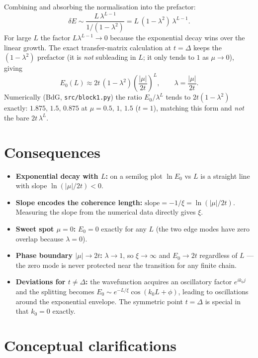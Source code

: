 \documentclass[11pt]{article}
\begin{document}
Combining and absorbing the normalisation into the prefactor:
\begin{equation}
  \delta E
  \sim \frac{L\,\lambda^{L-1}}{1/(1-\lambda^2)}
  = L\,(1-\lambda^2)\,\lambda^{L-1}.
\end{equation}
For large $L$ the factor $L\lambda^{L-1} \to 0$ because the exponential decay
wins over the linear growth.  The exact transfer-matrix calculation at
$t=\Delta$ keeps the $(1-\lambda^2)$ prefactor (it is \emph{not} subleading in
$L$; it only tends to $1$ as $\mu\to 0$), giving
\begin{equation}
  \boxed{E_0(L) \approx 2t\,(1-\lambda^2)\left(\frac{|\mu|}{2t}\right)^L,
  \qquad \lambda=\frac{|\mu|}{2t}.}
\end{equation}
Numerically (BdG, \texttt{src/block1.py}) the ratio $E_0/\lambda^L$ tends to
$2t(1-\lambda^2)$ exactly: $1.875,\,1.5,\,0.875$ at $\mu=0.5,\,1,\,1.5$
($t=1$), matching this form and \emph{not} the bare $2t\,\lambda^L$.

\section{Consequences}

\begin{itemize}
  \item \textbf{Exponential decay with $L$:} on a semilog plot $\ln E_0$ vs $L$
    is a straight line with slope $\ln(|\mu|/2t) < 0$.
  \item \textbf{Slope encodes the coherence length:}
    $\text{slope} = -1/\xi = \ln(|\mu|/2t)$.
    Measuring the slope from the numerical data directly gives $\xi$.
  \item \textbf{Sweet spot $\mu = 0$:} $E_0 = 0$ exactly for any $L$
    (the two edge modes have zero overlap because $\lambda = 0$).
  \item \textbf{Phase boundary $|\mu| \to 2t$:} $\lambda \to 1$, so $\xi \to \infty$
    and $E_0 \to 2t$ regardless of $L$ — the zero mode is never protected
    near the transition for any finite chain.
  \item \textbf{Deviations for $t \neq \Delta$:} the wavefunction acquires an
    oscillatory factor $e^{ik_0 j}$ and the splitting becomes
    $E_0 \sim e^{-L/\xi}\cos(k_0 L + \phi)$, leading to
    oscillations around the exponential envelope.  The symmetric point
    $t = \Delta$ is special in that $k_0 = 0$ exactly.
\end{itemize}

\section{Conceptual clarifications}
\end{document}
